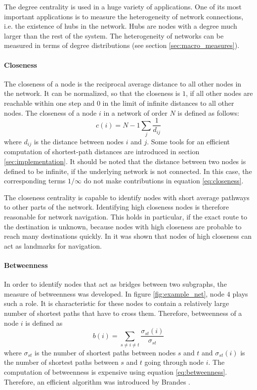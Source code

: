 The degree centrality is used in a huge variety of applications.
One of its most important applications is to measure the heterogeneity of network connections, i.e. the existence of hubs in the network.
Hubs are nodes with a degree much larger than the rest of the system.
The heterogeneity of networks can be measured in terms of degree distributions (see section \ref{sec:macro_measures}).

\paragraph{Closeness\color{Cayenne}{.}} 
The closeness of a node is the reciprocal average distance to all other nodes in the network.
It can be normalized, so that the closeness is $1$, if all other nodes are reachable within one step and $0$ in the limit of infinite distances to all other nodes.
The closeness of a node $i$ in a network of order $N$ is defined as follows:
\begin{equation}\label{eq:closeness}
c(i)=N-1 \sum _j \frac{1}{ d_{ij}}
\end{equation}
where $d_{ij}$ is the distance between nodes $i$ and $j$.
Some tools for an efficient computation of shortest-path distances are introduced in section \ref{sec:implementation}.
It should be noted that the distance between two nodes is defined to be infinite, if the underlying network is not connected.
In this case, the corresponding terms $1/\infty $ do not make contributions in equation \eqref{eq:closeness}.

The closeness centrality is capable to identify nodes with short average pathways to other parts of the network.
Identifying high closeness nodes is therefore reasonable for network navigation.
This holds in particular, if the exact route to the destination is unknown, because nodes with high closeness are probable to reach many destinations quickly.
In \citep{Zweig:closeness} it was shown that nodes of high closeness can act as landmarks for navigation.


\paragraph{Betweenness\color{Cayenne}{.}}
In order to identify nodes that act as bridges between two subgraphs, the measure of betweenness was developed.
In figure \ref{fig:example_net}, node $4$ plays such a role.
It is characteristic for these nodes to contain a relatively large number of shortest paths that have to cross them.
Therefore, betweenness of a node $i$ is defined as
\begin{equation}\label{eq:betweenness}
b(i)=\sum _{s\neq i \neq t} \frac{\sigma _{st}(i)}{\sigma _{st}}
\end{equation}
where $\sigma _{st}$ is the number of shortest paths between nodes $s$ and $t$ and $\sigma _{st} (i)$ is the number of shortest paths between $s$ and $t$ going through node $i$.
The computation of betweenness is expensive using equation \eqref{eq:betweenness}.
Therefore, an efficient algorithm was introduced by Brandes \citep{Brandes:2001p2757}.

